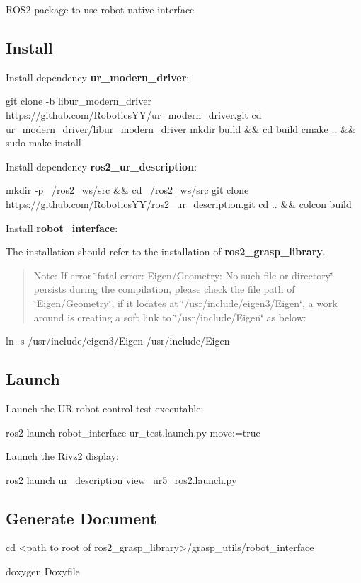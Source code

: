 R\+O\+S2 package to use robot native interface

\subsection*{Install}

Install dependency {\bfseries ur\+\_\+modern\+\_\+driver}\+:


\begin{DoxyCode}
git clone -b libur\_modern\_driver https://github.com/RoboticsYY/ur\_modern\_driver.git
cd ur\_modern\_driver/libur\_modern\_driver
mkdir build && cd build
cmake .. && sudo make install
\end{DoxyCode}


Install dependency {\bfseries ros2\+\_\+ur\+\_\+description}\+:


\begin{DoxyCode}
mkdir -p ~/ros2\_ws/src && cd ~/ros2\_ws/src
git clone https://github.com/RoboticsYY/ros2\_ur\_description.git
cd .. && colcon build
\end{DoxyCode}


Install {\bfseries robot\+\_\+interface}\+:

The installation should refer to the installation of {\bfseries ros2\+\_\+grasp\+\_\+library}.

\begin{quote}
Note\+: If error \char`\"{}fatal error\+: Eigen/\+Geometry\+: No such file or directory\char`\"{} persists during the compilation, please check the file path of \char`\"{}\+Eigen/\+Geometry\char`\"{}, if it locates at \char`\"{}/usr/include/eigen3/\+Eigen\char`\"{}, a work around is creating a soft link to \char`\"{}/usr/include/\+Eigen\char`\"{} as below\+: \end{quote}



\begin{DoxyCode}
ln -s /usr/include/eigen3/Eigen /usr/include/Eigen
\end{DoxyCode}


\subsection*{Launch}

Launch the UR robot control test executable\+:


\begin{DoxyCode}
ros2 launch robot\_interface ur\_test.launch.py move:=true
\end{DoxyCode}


Launch the Rivz2 display\+:


\begin{DoxyCode}
ros2 launch ur\_description view\_ur5\_ros2.launch.py
\end{DoxyCode}


\subsection*{Generate Document}


\begin{DoxyCode}
cd <path to root of ros2\_grasp\_library>/grasp\_utils/robot\_interface

doxygen Doxyfile
\end{DoxyCode}
 